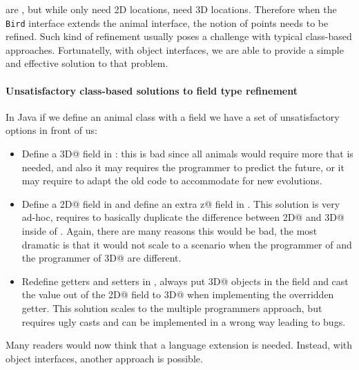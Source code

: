 
\Q@Bird@s are \Q@Animal@s, but while \Q@Animal@s only need 2D
locations, \Q@Bird@s need 3D locations. Therefore when the \texttt{Bird}
interface extends the animal interface, the notion of points needs to
be refined. Such kind of refinement usually poses a challenge
with typical class-based approaches. Fortunatelly, with object interfaces,
we are able to provide a simple and effective solution to that problem. 

\paragraph{Unsatisfactory class-based solutions to field type refinement}
In Java if we define an animal class with a field we have a set of unsatisfactory options in front of us:
\begin{itemize}
\item Define a \Q@Point3D@ field in \Q@Animal@:
this is bad since all animals would require more that is needed, and also it may requires the programmer to predict the future, or it may require to adapt the old code to accommodate for new evolutions.
\item Define a \Q@Point2D@ field in \Q@Animal@ and define an extra \Q@int z@ field in \Q@Bird@.
This solution is very ad-hoc, requires to basically duplicate the difference between \Q@Point2D@ and \Q@Point3D@ inside of \mbox{\Q@Bird@}.
Again, there are many reasons this would be bad, the most dramatic is that it would not scale to a scenario when the programmer of \Q@Bird@ and the programmer of \Q@Point3D@ are different.
\item Redefine getters and setters in \Q@Bird@, always put \Q@Point3D@ objects in the field and cast
the value out of the \Q@Point2D@ field to \Q@Point3D@ when implementing the overridden getter.
This solution scales to the multiple programmers approach, but requires ugly casts and can be implemented in a wrong way leading to bugs.
\end{itemize}

Many readers would now think that a language extension is needed. Instead, with object interfaces, 
another approach is possible.

